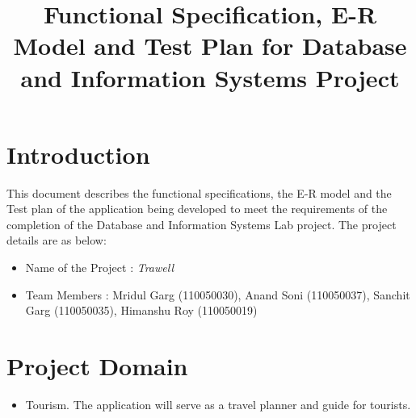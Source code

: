 \documentclass[11pt]{article}
\title{Functional Specification, E-R Model and Test Plan for Database and Information Systems Project}
\begin{document}
\maketitle
\section{Introduction}
This document describes the functional specifications, the E-R model and the Test plan of the application being developed to meet the requirements of the completion of the Database and Information Systems Lab project. The project details are as below: 
\begin{itemize}
\item Name of the Project : \emph{Trawell}
\item Team Members : Mridul Garg (110050030), Anand Soni (110050037), Sanchit Garg (110050035), Himanshu Roy (110050019) 
\end{itemize}

\section{Project Domain}
\begin{itemize}
\item Tourism. The application will serve as a travel planner and guide for tourists. 
\end{itemize}
\end{document}
